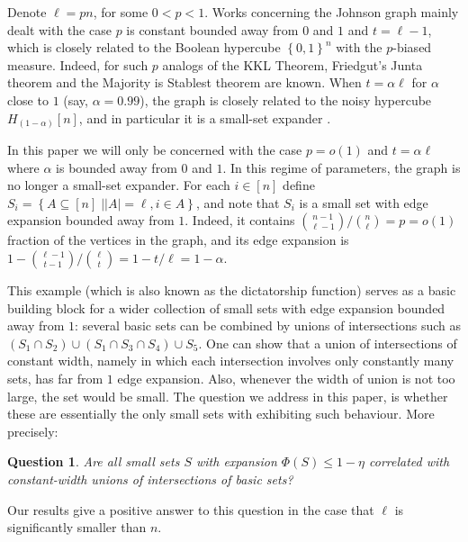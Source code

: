 \documentclass[11pt]{article}
\newtheorem{question}[theorem]{Question}
\newcommand\card[1]{\left| {#1} \right|}
\newcommand\sett[2]{\left\{ \left. #1 \;\right\vert #2 \right\}}
\newcommand\set[1]{{\left\{ #1 \right\}}}
\newcommand\power[1]{\set{0,1}^{#1}}
\renewcommand\leq{\leqslant}
\begin{document}
Denote $\ell = p n$, for some $0<p<1$. Works concerning the Johnson graph \cite{Wimmer14,F16a,F16b,FKMW16,FM16}
mainly dealt with the case $p$ is constant bounded away from $0$ %
and $1$ and $t=\ell-1$, which is closely related
to the Boolean hypercube $\power{n}$ with the $p$-biased measure. Indeed, for such $p$
analogs of the KKL Theorem, Friedgut's Junta theorem and the Majority is Stablest theorem are known. %
When $t=\alpha\ell$ for $\alpha$ close to $1$ (say, $\alpha = 0.99$), the graph is closely related to the noisy hypercube
$H_{(1-\alpha)}[n]$, and in particular it is a small-set expander \cite{LY}.

In this paper we will only be concerned with the case $p = o(1)$ and $t = \alpha\ell$ where $\alpha$ is bounded away from $0$ and $1$.
In this regime of parameters, the graph is no longer a small-set expander. For each $i\in [n]$ define
$S_i = \sett{A\subseteq[n]}{\card{A} = \ell, i\in A}$, and note that $S_i$ is a small set with edge expansion bounded away from
$1$. Indeed, it
contains ${n-1 \choose \ell-1}/{n \choose \ell} = p = o(1)$ fraction of the vertices in the graph, and its edge expansion is
$1 - {\ell - 1 \choose t-1}/{\ell \choose t} = 1 - t/\ell = 1-\alpha$.

This example (which is also known as the dictatorship function) serves as a basic building block for a wider collection of small sets with edge
expansion bounded away from $1$: several basic sets can be combined by unions of intersections such as $(S_1\cap S_2)\cup (S_1\cap S_3\cap S_4)\cup S_5$.
One can show that a union of intersections of constant width, namely in which each intersection involves only constantly many sets,
has far from $1$ edge expansion. Also, whenever the width of union is not too large, the set would be small.
The question we address in this paper, is whether these are essentially the only small sets with exhibiting such behaviour. More precisely:
\begin{question}\label{question:main}
  Are all small sets $S$ with expansion $\Phi(S)\leq 1-\eta$ correlated with constant-width unions of intersections of basic sets?
\end{question}
Our results give a positive answer to %
this  %
question in the case that $\ell$ is significantly smaller than $n$.
\end{document}
